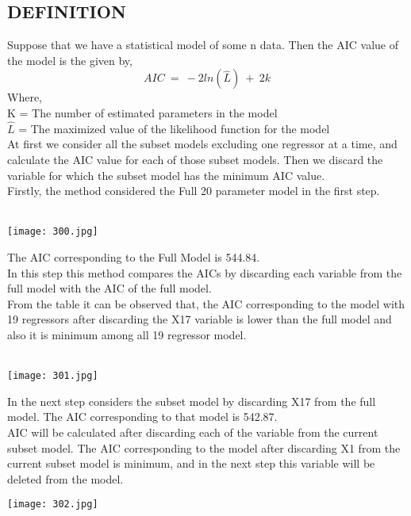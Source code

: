 \documentclass[a4paper,12pt,twoside]{book}
\begin{document}
\subsection*{DEFINITION}
Suppose that we have a statistical model of some n data. Then the AIC value of the model is the given by,\\
\[AIC\:=\:-2ln(\hat{L})\:+\:2k\]
Where,\\
K = The number of estimated parameters in the model\\
$\hat{L}$ = The maximized value of the likelihood function for the model\\
At first we consider all the subset models excluding one regressor at a time, and calculate the AIC value for each of those subset models. Then we discard the variable for which the subset model has the minimum AIC value.\\
Firstly, the method considered the Full 20 parameter model in the first step.\\\\
\begin{center}
\texttt{[image: 300.jpg]}\\
\end{center}
The AIC corresponding to the Full Model is 544.84.\\
In this step this method compares the AICs by discarding each variable from the full model with the AIC of the full model.\\
From the table it can be observed that, the AIC corresponding to the model with 19 regressors after discarding the X17 variable is lower than the full model and also it is minimum among all 19 regressor model.\\\\
\begin{center}
\texttt{[image: 301.jpg]}\\
\end{center}
In the next step considers the subset model by discarding X17 from the full model. The AIC corresponding to that model is 542.87.\\
AIC will be calculated after discarding each of the variable from the current subset model. The AIC corresponding to the model after discarding X1 from the current subset model is minimum, and in the next step this variable will be deleted from the model.\\
\begin{center}
\texttt{[image: 302.jpg]}\\
\end{center}
\end{document}
